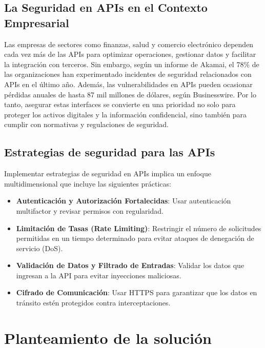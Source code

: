 \documentclass{article}
\begin{document}
    \subsection{La Seguridad en APIs en el Contexto Empresarial}
    Las empresas de sectores como finanzas, salud y comercio electrónico dependen cada vez más de las APIs para optimizar operaciones, gestionar datos y facilitar la integración con terceros. Sin embargo, según un informe de Akamai, el 78\% de las organizaciones han experimentado incidentes de seguridad relacionados con APIs en el último año. Además, las vulnerabilidades en APIs pueden ocasionar pérdidas anuales de hasta 87 mil millones de dólares, según Businesswire. Por lo tanto, asegurar estas interfaces se convierte en una prioridad no solo para proteger los activos digitales y la información confidencial, sino también para cumplir con normativas y regulaciones de seguridad.

    \subsection{Estrategias de seguridad para las APIs}
    Implementar estrategias de seguridad en APIs implica un enfoque multidimensional que incluye las siguientes prácticas:

    \begin{itemize}
        \item \textbf{Autenticación y Autorización Fortalecidas}: Usar autenticación multifactor y revisar permisos con regularidad.
        \item \textbf{Limitación de Tasas (Rate Limiting)}: Restringir el número de solicitudes permitidas en un tiempo determinado para evitar ataques de denegación de servicio (DoS).
        \item \textbf{Validación de Datos y Filtrado de Entradas}: Validar los datos que ingresan a la API para evitar inyecciones maliciosas.
        \item \textbf{Cifrado de Comunicación}: Usar HTTPS para garantizar que los datos en tránsito estén protegidos contra interceptaciones.
    \end{itemize}

    \section{Planteamiento de la solución}
\end{document}
